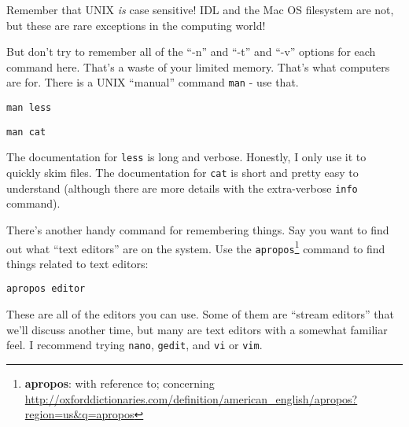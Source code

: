 \documentclass{article}
\begin{document}
\begin{spacing}{1.0}
Remember that UNIX \emph{is} case sensitive!  IDL and the Mac OS filesystem are
not, but these are rare exceptions in the computing world!

But don't try to remember all of the ``-n'' and ``-t'' and ``-v'' options for
each command here.  That's a waste of your limited memory.  That's what computers
are for.  There is a UNIX ``manual'' command \texttt{man} - use that.

\verb|man less|

\verb|man cat|

The documentation for \verb|less| is long and verbose.  Honestly, I only use it to quickly
skim files.  The documentation for \verb|cat| is short and pretty easy to understand (although
there are more details with the extra-verbose \verb|info| command).

There's another handy command for remembering things.  Say you want to find out what ``text editors''
are on the system.  Use the \verb|apropos|\footnote{\textbf{apropos}: with
reference to; concerning
\url{http://oxforddictionaries.com/definition/american_english/apropos?region=us&q=apropos}}
command to find things related to text editors:

\verb|apropos editor|

These are all of the editors you can use.  Some of them are ``stream editors''
that we'll discuss another time, but many are text editors with a somewhat
familiar feel.  I recommend trying \texttt{nano}, \texttt{gedit}, and
\texttt{vi} or \texttt{vim}.  



\end{spacing}
\end{document}
